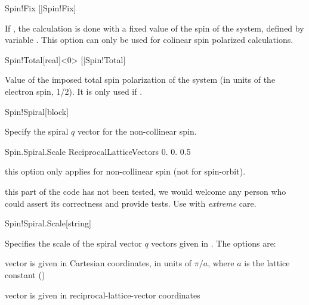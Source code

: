 \begin{fdflogicalF}{Spin!Fix}
  [|Spin!Fix]%

  If \fdftrue, the calculation is done with a fixed value of the spin
  of the system, defined by variable . This option can
  only be used for colinear spin polarized calculations.

\end{fdflogicalF}

\begin{fdfentry}{Spin!Total}[real]<$0$>
  [|Spin!Total]
  
  Value of the imposed total spin polarization of the system (in units
  of the electron spin, 1/2). It is only used if  \fdftrue.
  
\end{fdfentry}

\begin{fdfentry}{Spin!Spiral}[block]

  Specify the spiral $q$ vector for the non-collinear spin.

  \begin{fdfexample}
    Spin.Spiral.Scale ReciprocalLatticeVectors
      0. 0. 0.5
  \end{fdfexample}

  \note this option only applies for non-collinear spin (not for
  spin-orbit).

  \note this part of the code has not been tested, we would welcome
  any person who could assert its correctness and provide tests. Use
  with \emph{extreme} care.

\end{fdfentry}

\begin{fdfentry}{Spin!Spiral.Scale}[string]

  Specifies the scale of the spiral vector $q$ vectors given in .
  The options are:
  \begin{fdfoptions}
    \option[pi/a]%
    vector is given in Cartesian coordinates, in units
    of $\pi/a$, where $a$ is the lattice constant ()

    \option[ReciprocalLatticeVectors]%
    vector is given in reciprocal-lattice-vector coordinates

  \end{fdfoptions}

\end{fdfentry}

